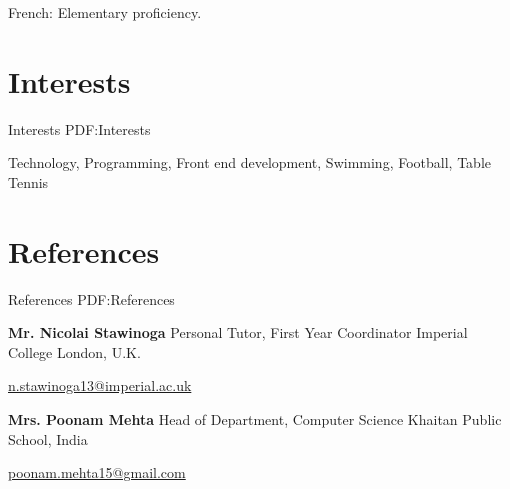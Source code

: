 \documentclass[letterpaper,10pt,oneside]{article}
\begin{document}
\begin{body}
\GapNoBreak
\BulletItem
French: Elementary proficiency.


\section
{Interests}
{Interests}
{PDF:Interests}

Technology, Programming,
\newline
Front end development,
\newline
Swimming, Football, Table Tennis


\section
{References}
{References}
{PDF:References}

\BulletItem
\textbf{Mr. Nicolai Stawinoga}
\newline
Personal Tutor, First Year Coordinator
\newline
Imperial College London, U.K.
\begin{detail}
\SubItem
\href{mailto:n.stawinoga13@imperial.ac.uk}
{n.stawinoga13@imperial.ac.uk}
\,
\end{detail}

\GapNoBreak

\BulletItem
\textbf{Mrs. Poonam Mehta}
\newline
Head of Department, Computer Science
\newline
Khaitan Public School, India
\begin{detail}
\SubItem
\href{mailto:poonam.mehta15@gmail.com}
{poonam.mehta15@gmail.com}
\,
\end{detail}

\end{body}

\label{LastPage}~
\end{document}
